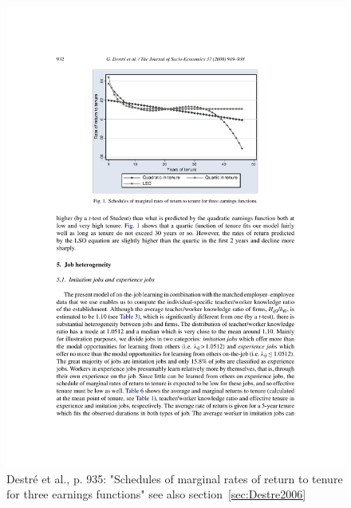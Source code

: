 \documentclass[12pt,a4paper]{article}
\begin{document}
    \begin{figure}[htb]
      \centering
      \includegraphics[width=12cm]{Meeting 4 LEARNING FROM EXPERIENCE - Seite 932.pdf}
      \caption{Destré et al., p. 935: "Schedules of marginal rates of return to tenure for three earnings functions" see also section~\ref{sec:Destre2006}}
      \label{fig:Destré marginalreturntotenureearningfunction}
    \end{figure}
\end{document}
